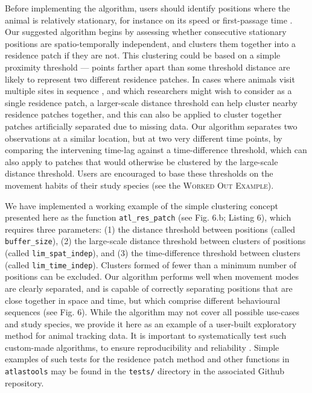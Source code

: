 \begin{refsection}
    Before implementing the algorithm, users should identify positions where the animal is relatively stationary, for instance on its speed or first-passage time \citep{bracis2018,barraquand2008}.
    Our suggested algorithm begins by assessing whether consecutive stationary positions are spatio-temporally independent, and clusters them together into a residence patch if they are not.
    This clustering could be based on a simple proximity threshold --- points farther apart than some threshold distance are likely to represent two different residence patches.
    In cases where animals visit multiple sites in sequence \citep[such as traplining][]{thomson1997}, and which researchers might wish to consider as a single residence patch, a larger-scale distance threshold can help cluster nearby residence patches together, and this can also be applied to cluster together patches artificially separated due to missing data.
    Our algorithm separates two observations at a similar location, but at two very different time points, by comparing the intervening time-lag against a time-difference threshold, which can also apply to patches that would otherwise be clustered by the large-scale distance threshold.
    Users are encouraged to base these thresholds on the movement habits of their study species (see the \textsc{Worked Out Example}).

    We have implemented a working example of the simple clustering concept presented here as the function \texttt{atl\_res\_patch} (see Fig. 6.b; Listing 6), which requires three parameters: (1) the distance threshold between positions (called \texttt{buffer\_size}), (2) the large-scale distance threshold between clusters of positions (called \texttt{lim\_spat\_indep}), and (3) the time-difference threshold between clusters (called \texttt{lim\_time\_indep}).
    Clusters formed of fewer than a minimum number of positions can be excluded.
    Our algorithm performs well when movement modes are clearly separated, and is capable of correctly separating positions that are close together in space and time, but which comprise different behavioural sequences (see Fig. 6).
    While the algorithm may not cover all possible use-cases and study species, we provide it here as an example of a user-built exploratory method for animal tracking data.
    It is important to systematically test such custom-made algorithms, to ensure reproducibility and reliability \citep{wickham2015, marwick2018}.
    Simple examples of such tests for the residence patch method and other functions in \texttt{atlastools} may be found in the \texttt{tests/} directory in the associated Github repository.


\end{refsection}
